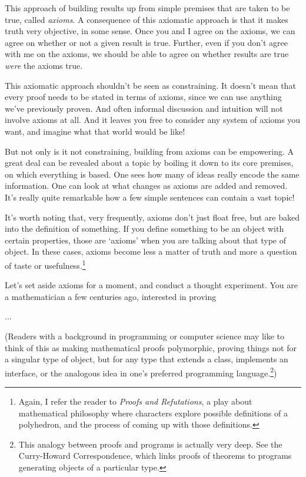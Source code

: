 \documentclass{report}
\begin{document}
This approach of building results up from simple premises that are taken to be true, called \emph{axioms}. A consequence of this axiomatic approach is that it makes truth very objective, in some sense. Once you and I agree on the axioms, we can agree on whether or not a given result is true.
Further, even if you don't agree with me on the axioms, we should be able to agree on whether results are true \emph{were} the axioms true.

This axiomatic approach shouldn't be seen as constraining. It doesn't mean that every proof needs to be stated in terms of axioms, since we can use anything we've previously proven. And often informal discussion and intuition will not involve axioms at all. And it leaves you free to consider any system of axioms you want, and imagine what that world would be like!

But not only is it not constraining, building from axioms can be empowering. A great deal can be revealed about a topic by boiling it down to its core premises, on which everything is based. One sees how many of ideas really encode the same information. One can look at what changes as axioms are added and removed. It's really quite remarkable how a few simple sentences can contain a vast topic!

It's worth noting that, very frequently, axioms don't just float free, but are baked into the definition of something. If you define something to be an object with certain properties, those are `axioms' when you are talking about that type of object. In these cases, axioms become less a matter of truth and more a question of taste or usefulness.\footnote{Again, I refer the reader to \emph{Proofs and Refutations}, a play about mathematical philosophy where characters explore possible definitions of a polyhedron, and the process of coming up with those definitions.}

Let's set aside axioms for a moment, and conduct a thought experiment. You are a mathematician a few centuries ago, interested in proving 

...

(Readers with a background in programming or computer science may like to think of this as making mathematical proofs polymorphic, proving things not for a singular type of object, but for any type that extends a class, implements an interface, or the analogous idea in one's preferred programming language.\footnote{This analogy between proofs and programs is actually very deep. See the Curry-Howard Correspondence, which links proofs of theorems to programs generating objects of a particular type.})
\end{document}
